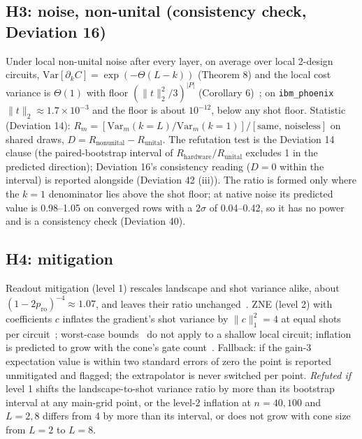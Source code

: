 \documentclass[aps,prxquantum,reprint,superscriptaddress,nofootinbib,longbibliography,amsmath,amssymb]{revtex4-2}
\newcommand{\Var}{\mathrm{Var}}
\begin{document}
\subsection{H3: noise, non-unital (consistency check, Deviation 16)}
Under local non-unital noise after every layer, on average over local 2-design circuits, $\Var[\partial_k C] = \exp(-\Theta(L-k))$ (Theorem 8) and the local cost variance is $\Theta(1)$ with floor $(\|t\|_2^2/3)^{|P|}$ (Corollary 6)~\cite{Mele2026}; on \texttt{ibm\_phoenix} $\|t\|_2 \approx 1.7\times10^{-3}$ and the floor is about $10^{-12}$, below any shot floor. Statistic (Deviation 14): $R_m = [\Var_m(k{=}L)/\Var_m(k{=}1)]/[\text{same, noiseless}]$ on shared draws, $D = R_{\mathrm{nonunital}} - R_{\mathrm{unital}}$. The refutation test is the Deviation 14 clause (the paired-bootstrap interval of $R_{\mathrm{hardware}}/R_{\mathrm{unital}}$ excludes 1 in the predicted direction); Deviation 16's consistency reading ($D = 0$ within the interval) is reported alongside (Deviation 42 (iii)). The ratio is formed only where the $k = 1$ denominator lies above the shot floor; at native noise its predicted value is 0.98--1.05 on converged rows with a $2\sigma$ of 0.04--0.42, so it has no power and is a consistency check (Deviation 40).

\subsection{H4: mitigation}
Readout mitigation (level 1) rescales landscape and shot variance alike, about $(1 - 2p_{\mathrm{ro}})^{-4} \approx 1.07$, and leaves their ratio unchanged~\cite{AghaeiSaem2026}. ZNE (level 2) with coefficients $c$ inflates the gradient's shot variance by $\|c\|_1^2 = 4$ at equal shots per circuit~\cite{Banchi2026}; worst-case bounds~\cite{Quek2024} do not apply to a shallow local circuit; inflation is predicted to grow with the cone's gate count~\cite{Quek2024,Kim2023}. Fallback: if the gain-3 expectation value is within two standard errors of zero the point is reported unmitigated and flagged; the extrapolator is never switched per point. \emph{Refuted if} level 1 shifts the landscape-to-shot variance ratio by more than its bootstrap interval at any main-grid point, or the level-2 inflation at $n = 40, 100$ and $L = 2, 8$ differs from 4 by more than its interval, or does not grow with cone size from $L = 2$ to $L = 8$.
\end{document}
